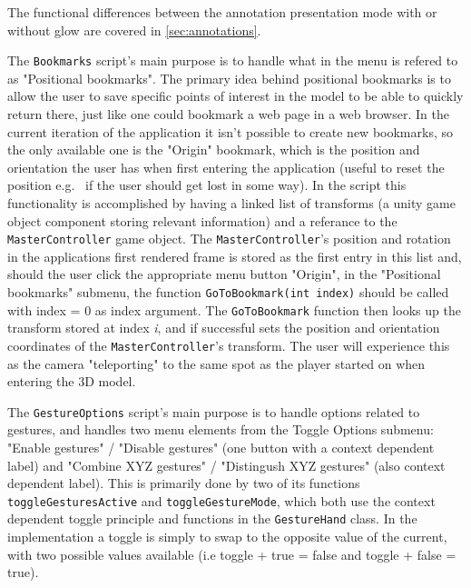 The functional differences between the annotation presentation mode with or without glow are covered in \ref{sec:annotations}. 

The \texttt{Bookmarks} script's main purpose is to handle what in the menu is refered to as "Positional bookmarks". The primary idea behind positional bookmarks 
is to allow the user to save specific points of interest in the model to be able to quickly return there, just like one could bookmark a web page in a web browser. 
In the current iteration of the application it isn't possible to create new bookmarks, so the only available one is the "Origin" bookmark, which is the position and orientation
the user has when first entering the application (useful to reset the position e.g.~ if the user should get lost in some way). In the script this functionality is accomplished
by having a linked list of transforms (a unity game object component storing relevant information) and a referance to the \texttt{MasterController} game object. 
The \texttt{MasterController}'s position and rotation in the applications first rendered frame is stored as the first entry in this list and, should the user click the 
appropriate menu button "Origin", in the "Positional bookmarks" submenu, the function \texttt{GoToBookmark(int index)} should be called with index = 0 as index argument. 
The \texttt{GoToBookmark} function then looks up the transform stored at index \textit{i}, and if successful sets the position and orientation coordinates of the 
\texttt{MasterController}'s transform. The user will experience this as the camera "teleporting" to the same spot as the player started on when entering the 3D model.

The \texttt{GestureOptions} script's main purpose is to handle options related to gestures, and handles two menu elements from the Toggle Options submenu:
"Enable gestures" / "Disable gestures" (one button with a context dependent label) and "Combine XYZ gestures" / "Distingush XYZ gestures" (also context dependent label). This is 
primarily done by two of its functions \texttt{toggleGesturesActive} and \texttt{toggleGestureMode}, which both use the context dependent toggle principle 
and functions in the \texttt{GestureHand} class. In the implementation a toggle is simply to swap to the opposite value of the current, with two possible values available (i.e 
toggle + true = false and toggle + false = true).


